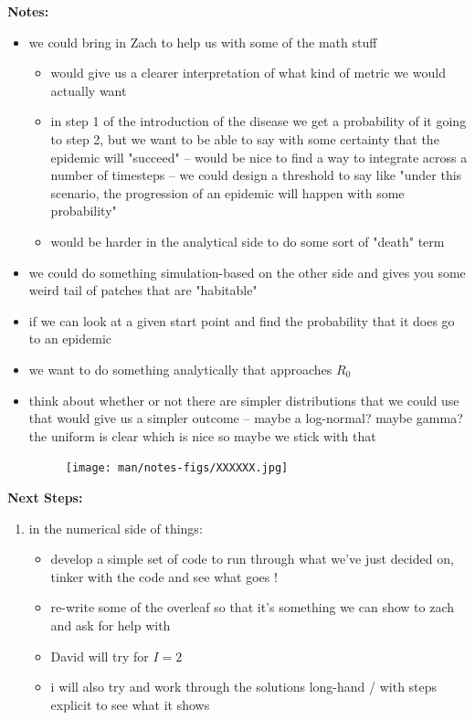 \documentclass[11pt]{article}
\begin{document}
\textbf{Notes:}
\begin{itemize}
    \item  we could bring in Zach to help us with some of the math stuff 
    \begin{itemize}
        \item would give us a clearer interpretation of what kind of metric we would actually want 
        \item in step 1 of the introduction of the disease we get a probability of it going to step 2, but we want to be able to say with some certainty that the epidemic will "succeed" -- would be nice to find a way to integrate across a number of timesteps -- we could design a threshold to say like "under this scenario, the progression of an epidemic will happen with some probability"
        \item would be harder in the analytical side to do some sort of "death" term 
    \end{itemize}
    \item we could do something simulation-based on the other side and gives you some weird tail of patches that are "habitable" 
    \item if we can look at a given start point and find the probability that it does go to an epidemic
    \item we want to do something analytically that approaches $R_0$
    \item think about whether or not there are simpler distributions that we could use that would give us a simpler outcome -- maybe a log-normal? maybe gamma? the uniform is clear which is nice so maybe we stick with that 

\begin{figure}[!hpt]
    \centering
    \texttt{[image: man/notes-figs/XXXXXX.jpg]}
    \caption{}
    \label{}
\end{figure}
\end{itemize}

\textbf{Next Steps:}
\begin{enumerate}
    \item in the numerical side of things: 
    \begin{itemize}
        \item develop a simple set of code to run through what we've just decided on, tinker with the code and see what goes ! 
        \item re-write some of the overleaf so that it's something we can show to zach and ask for help with 
        \item David will try for $I=2$
        \item i will also try and work through the solutions long-hand / with steps explicit to see what it shows 
    \end{itemize}
\end{enumerate}
\end{document}
